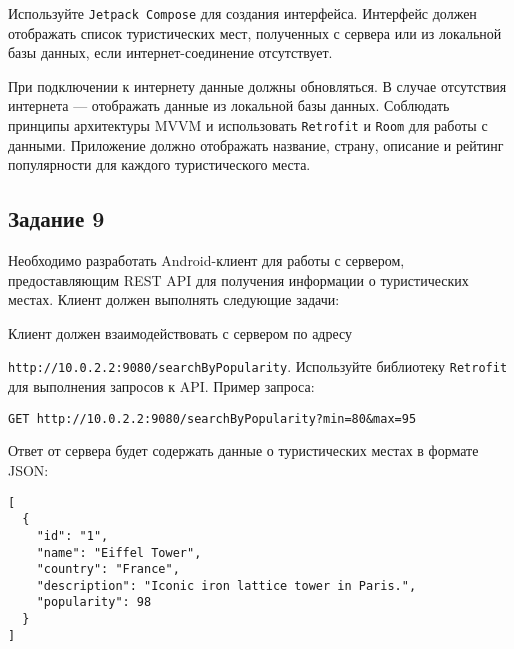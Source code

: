 \documentclass[a4paper,12pt]{article}
\begin{document}

Используйте \texttt{Jetpack Compose} для создания интерфейса. Интерфейс должен отображать список туристических мест, полученных с сервера или из локальной базы данных, если интернет-соединение отсутствует.


При подключении к интернету данные должны обновляться.
В случае отсутствия интернета — отображать данные из локальной базы данных.
Соблюдать принципы архитектуры MVVM и использовать \texttt{Retrofit} и \texttt{Room} для работы с данными.
Приложение должно отображать название, страну, описание и рейтинг популярности для каждого туристического места.
\subsection*{Задание 9}

Необходимо разработать Android-клиент для работы с сервером, предоставляющим REST API для получения информации о туристических местах. Клиент должен выполнять следующие задачи:

Клиент должен взаимодействовать с сервером по адресу 

\texttt{http://10.0.2.2:9080/searchByPopularity}. Используйте библиотеку \texttt{Retrofit} для выполнения запросов к API. Пример запроса:

\begin{verbatim}
GET http://10.0.2.2:9080/searchByPopularity?min=80&max=95
\end{verbatim}

Ответ от сервера будет содержать данные о туристических местах в формате JSON:

\begin{verbatim}
[
  {
    "id": "1",
    "name": "Eiffel Tower",
    "country": "France",
    "description": "Iconic iron lattice tower in Paris.",
    "popularity": 98
  }
]
\end{verbatim}
\end{document}
